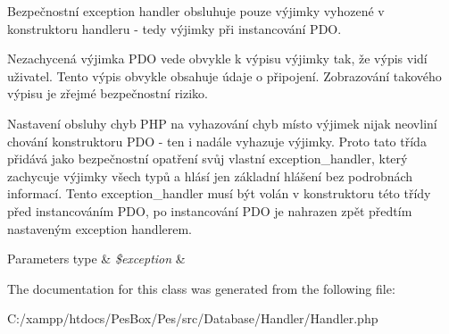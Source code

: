 Bezpečnostní exception handler obsluhuje pouze výjimky vyhozené v konstruktoru handleru -\/ tedy výjimky při instancování P\+DO.

Nezachycená výjimka P\+DO vede obvykle k výpisu výjimky tak, že výpis vidí uživatel. Tento výpis obvykle obsahuje údaje o připojení. Zobrazování takového výpisu je zřejmé bezpečnostní riziko.

Nastavení obsluhy chyb P\+HP na vyhazování chyb místo výjimek nijak neovliní chování konstruktoru P\+DO -\/ ten i nadále vyhazuje výjimky. Proto tato třída přidává jako bezpečnostní opatření svůj vlastní exception\+\_\+handler, který zachycuje výjimky všech typů a hlásí jen základní hlášení bez podrobnách informací. Tento exception\+\_\+handler musí být volán v konstruktoru této třídy před instancováním P\+DO, po instancování P\+DO je nahrazen zpět předtím nastaveným exception handlerem.


\begin{DoxyParams}[1]{Parameters}
type & {\em \$exception} & \\
\hline
\end{DoxyParams}


The documentation for this class was generated from the following file\+:\begin{DoxyCompactItemize}
\item 
C\+:/xampp/htdocs/\+Pes\+Box/\+Pes/src/\+Database/\+Handler/Handler.\+php\end{DoxyCompactItemize}
